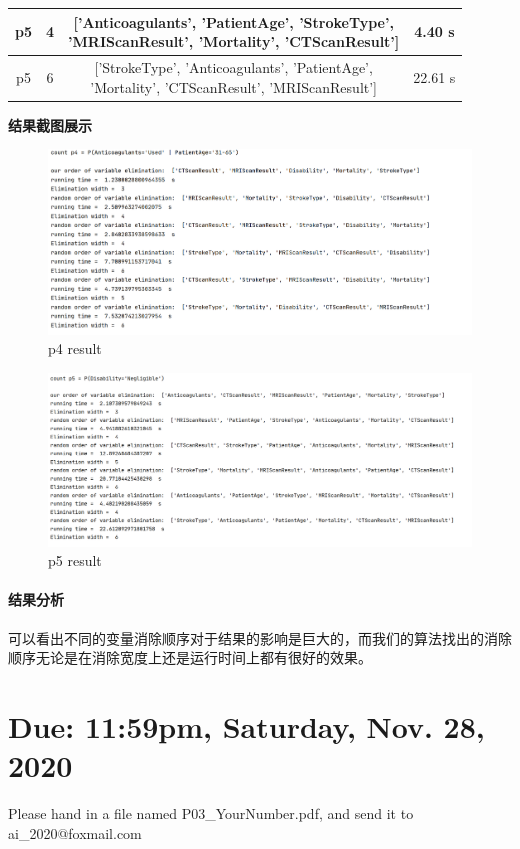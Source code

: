 \documentclass[a4paper, 11pt]{article}
\begin{document}
\begin{enumerate}
\begin{tabular}{|c|c|c|c|}
p5  & 4 & \tabincell{c}{['Anticoagulants', 'PatientAge', 'StrokeType',\\ 'MRIScanResult', 'Mortality', 'CTScanResult']}    &   4.40 s    \\ \hline
p5  & 6 & \tabincell{c}{['StrokeType', 'Anticoagulants', 'PatientAge',\\ 'Mortality', 'CTScanResult', 'MRIScanResult']}    &   22.61 s   \\ \hline
\end{tabular} 
\newpage
\textbf{结果截图展示}
\begin{figure}[H]
\centering
\includegraphics[width=1\textwidth]{Pic/un4.png}
\caption{p4 result}
\end{figure}
\begin{figure}[H]
\centering
\includegraphics[width=1\textwidth]{Pic/un5.png}
\caption{p5 result}
\end{figure}
\paragraph{结果分析}
可以看出不同的变量消除顺序对于结果的影响是巨大的，而我们的算法找出的消除顺序无论是在消除宽度上还是运行时间上都有很好的效果。
\section{Due: 11:59pm, Saturday, Nov. 28, 2020}

 Please hand in a file named \textsf{P03\_YourNumber.pdf}, and send it to \textsf{ai\_2020@foxmail.com}
\end{enumerate}
\end{document}
